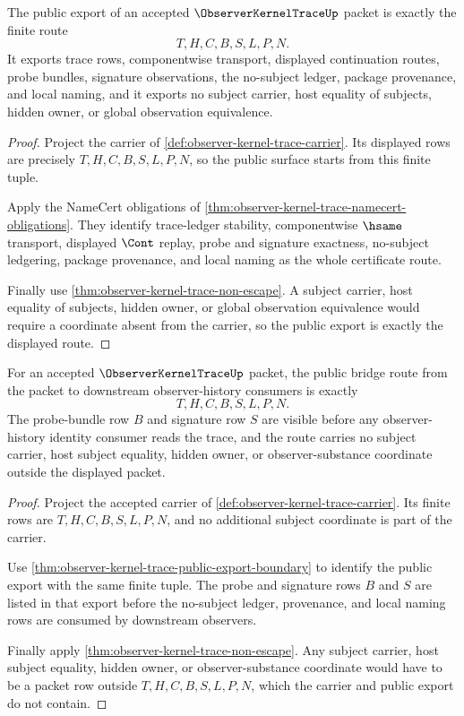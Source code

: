 \begin{theorem}
\label{thm:observer-kernel-trace-public-export-boundary}
The public export of an accepted $\ObserverKernelTraceUp$ packet is exactly the finite route
$$
T,H,C,B,S,L,P,N.
$$
It exports trace rows, componentwise transport, displayed continuation routes, probe bundles, signature observations, the no-subject ledger, package provenance, and local naming, and it exports no subject carrier, host equality of subjects, hidden owner, or global observation equivalence.
\end{theorem}
\begin{proof}
Project the carrier of \autoref{def:observer-kernel-trace-carrier}. Its displayed rows are precisely $T,H,C,B,S,L,P,N$, so the public surface starts from this finite tuple.

Apply the NameCert obligations of \autoref{thm:observer-kernel-trace-namecert-obligations}. They identify trace-ledger stability, componentwise $\hsame$ transport, displayed $\Cont$ replay, probe and signature exactness, no-subject ledgering, package provenance, and local naming as the whole certificate route.

Finally use \autoref{thm:observer-kernel-trace-non-escape}. A subject carrier, host equality of subjects, hidden owner, or global observation equivalence would require a coordinate absent from the carrier, so the public export is exactly the displayed route.
\end{proof}

\begin{theorem}
\label{thm:observer-kernel-trace-public-bridge-route}
For an accepted $\ObserverKernelTraceUp$ packet, the public bridge route from the packet to downstream observer-history consumers is exactly
$$
T,H,C,B,S,L,P,N.
$$
The probe-bundle row $B$ and signature row $S$ are visible before any observer-history identity consumer reads the trace, and the route carries no subject carrier, host subject equality, hidden owner, or observer-substance coordinate outside the displayed packet.
\end{theorem}
\begin{proof}
Project the accepted carrier of \autoref{def:observer-kernel-trace-carrier}. Its finite rows are $T,H,C,B,S,L,P,N$, and no additional subject coordinate is part of the carrier.

Use \autoref{thm:observer-kernel-trace-public-export-boundary} to identify the public export with the same finite tuple. The probe and signature rows $B$ and $S$ are listed in that export before the no-subject ledger, provenance, and local naming rows are consumed by downstream observers.

Finally apply \autoref{thm:observer-kernel-trace-non-escape}. Any subject carrier, host subject equality, hidden owner, or observer-substance coordinate would have to be a packet row outside $T,H,C,B,S,L,P,N$, which the carrier and public export do not contain.
\end{proof}

